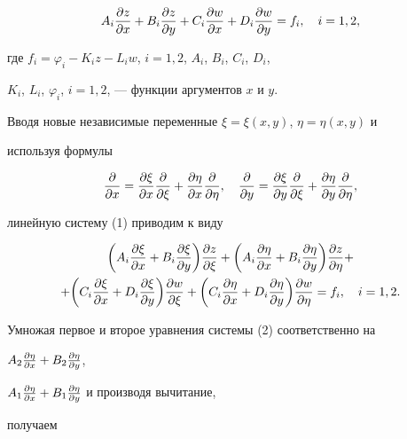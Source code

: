 \begin{equation} 


A_i\myfrac{z}{x}+B_i\myfrac{z}{y}+C_i\myfrac{w}{x}+ 


D_i\myfrac{w}{y}=f_i,\quad i=1,2, 


\end{equation} 


где $f_i=\varphi_i-K_i z-L_i w$, $i=1,2$, $A_i$, $B_i$, $C_i$, $D_i$, 


$K_i$, $L_i$, $\varphi_i$, $i=1,2$, --- функции аргументов $x$ и $y$. 


Вводя новые независимые переменные $\xi=\xi(x,y)$, $\eta=\eta(x,y)$ и 


используя формулы 


$$ 


\myfrac{}{x}=\myfrac{\xi}{x}\myfrac{}{\xi}+\myfrac{\eta}{x} 


\myfrac{}{\eta},\quad \myfrac{}{y}=\myfrac{\xi}{y} 


\myfrac{}{\xi}+\myfrac{\eta}{y}\myfrac{}{\eta}, 


$$ 


линейную систему (1) приводим к виду 


\begin{multline} 


\bigg(A_i\myfrac{\xi}{x}+B_i\myfrac{\xi}{y} \bigg) 


\myfrac{z}{\xi}+\bigg(A_i\myfrac{\eta}{x}+ 


B_i\myfrac{\eta}{y} \bigg)\myfrac{z}{\eta}+ \\ 


% 


+\bigg(C_i\myfrac{\xi}{x}+D_i\myfrac{\xi}{y} \bigg) 


\myfrac{w}{\xi}+\bigg(C_i\myfrac{\eta}{x}+D_i\myfrac{\eta}{y} \bigg) 


\myfrac{w}{\eta}=f_i,\quad i=1,2. 


\end{multline} 


Умножая первое и второе уравнения системы (2) соответственно на 


$A_2\frac{\partial \eta}{\partial x}+B_2\frac{\partial \eta}{\partial y}$, 


$A_1\frac{\partial \eta}{\partial x}+B_1\frac{\partial \eta}{\partial y}$ и производя вычитание, 


получаем 


